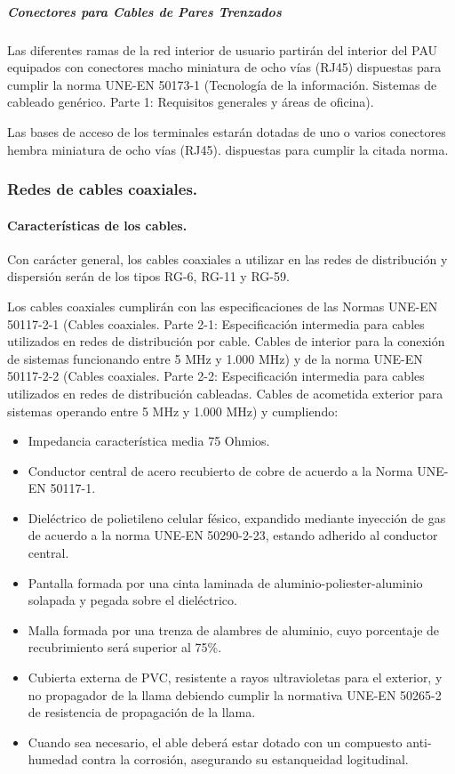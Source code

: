 \subparagraph{Conectores para Cables de Pares Trenzados}
Las diferentes ramas de la red interior de usuario partirán del interior del PAU equipados con conectores macho miniatura de ocho vías (RJ45) dispuestas para cumplir la norma UNE-EN 50173-1 (Tecnología de la información. Sistemas de cableado genérico. Parte 1: Requisitos generales y áreas de oficina).

Las bases de acceso de los terminales estarán dotadas de uno o varios conectores hembra miniatura de ocho vías (RJ45). dispuestas para cumplir la citada norma.

\subsubsection{Redes de cables coaxiales.}
\paragraph{Características de los cables.}
Con carácter general, los cables coaxiales a utilizar en las redes de distribución y dispersión serán de los tipos RG-6, RG-11 y RG-59.

Los cables coaxiales cumplirán con las especificaciones de las Normas UNE-EN 50117-2-1 (Cables  coaxiales. Parte 2-1: Especificación intermedia para cables utilizados en redes de distribución por cable. Cables de interior para la conexión de sistemas funcionando entre 5 MHz y 1.000 MHz) y de la norma UNE-EN 50117-2-2 (Cables coaxiales. Parte 2-2: Especificación intermedia para cables utilizados en redes de distribución cableadas. Cables de acometida exterior para sistemas operando entre 5 MHz y 1.000 MHz) y cumpliendo:
\begin{itemize}
	\item Impedancia característica media 75 Ohmios.
	\item Conductor central de acero recubierto de cobre de acuerdo a la Norma UNE-EN 50117-1.
	\item Dieléctrico de polietileno celular fésico, expandido mediante inyección de gas de acuerdo a la norma UNE-EN 50290-2-23, estando adherido al conductor central.
	\item Pantalla formada por una cinta laminada de aluminio-poliester-aluminio solapada y pegada sobre el dieléctrico.
	\item Malla formada por una trenza de alambres de aluminio, cuyo porcentaje de recubrimiento será superior al 75\%.
	\item Cubierta externa de PVC, resistente a rayos ultravioletas para el exterior, y no propagador de la llama debiendo cumplir la normativa UNE-EN 50265-2 de resistencia de propagación de la llama.
	\item Cuando sea necesario, el able deberá estar dotado con un compuesto anti-humedad contra la corrosión, asegurando su estanqueidad logitudinal.
\end{itemize}

